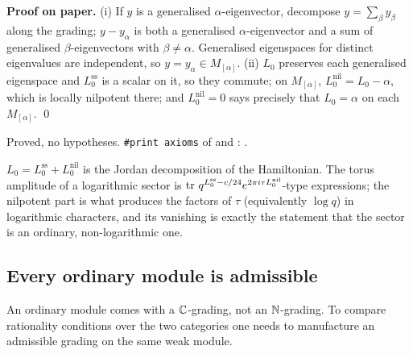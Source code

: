 \textbf{Proof on paper.} (i) If $y$ is a generalised $\alpha$-eigenvector, decompose $y = \sum_\beta y_\beta$
along the grading; $y - y_\alpha$ is both a generalised $\alpha$-eigenvector and a sum of generalised
$\beta$-eigenvectors with $\beta\neq\alpha$. Generalised eigenspaces for distinct eigenvalues are
independent, so $y = y_\alpha\in M_{[\alpha]}$. (ii) $L_0$ preserves each generalised eigenspace and
$L_0^{\mathrm{ss}}$ is a scalar on it, so they commute; on $M_{[\alpha]}$, $L_0^{\mathrm{nil}} = L_0-\alpha$,
which is locally nilpotent there; and $L_0^{\mathrm{nil}}=0$ says precisely that $L_0 = \alpha$ on each
$M_{[\alpha]}$. \qed

\begin{status}
Proved, no hypotheses. \texttt{\#print axioms} of  and
: .
\end{status}

\begin{physics}
$L_0 = L_0^{\mathrm{ss}} + L_0^{\mathrm{nil}}$ is the Jordan decomposition of the Hamiltonian. The torus
amplitude of a logarithmic sector is $\operatorname{tr}\, q^{L_0^{\mathrm{ss}}-c/24}e^{2\pi i\tau L_0^{\mathrm{nil}}}$-type
expressions; the nilpotent part is what produces the factors of $\tau$ (equivalently $\log q$) in logarithmic
characters, and its vanishing is exactly the statement that the sector is an ordinary, non-logarithmic one.
\end{physics}

\subsection{Every ordinary module is admissible}

An ordinary module comes with a ${\mathbb{C}}$-grading, not an ${\mathbb{N}}$-grading. To compare rationality
conditions over the two categories one needs to manufacture an admissible grading on the same weak
module.

